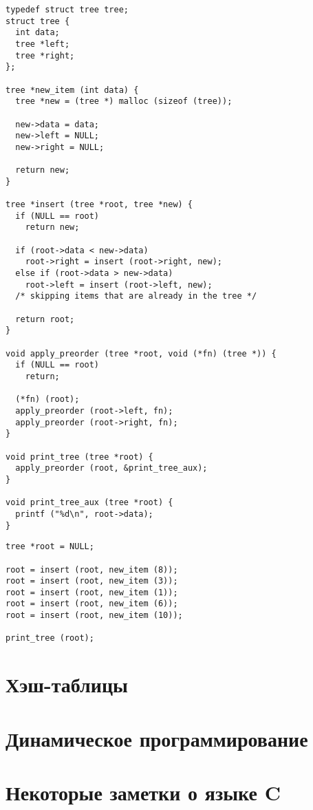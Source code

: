 \lstset{label=lst:bst-impl,caption=Некоторые операции}
\begin{lstlisting}
typedef struct tree tree;
struct tree {
  int data;
  tree *left;
  tree *right;
};

tree *new_item (int data) {
  tree *new = (tree *) malloc (sizeof (tree));

  new->data = data;
  new->left = NULL;
  new->right = NULL;

  return new;
}

tree *insert (tree *root, tree *new) {
  if (NULL == root)
    return new;

  if (root->data < new->data)
    root->right = insert (root->right, new);
  else if (root->data > new->data)
    root->left = insert (root->left, new);
  /* skipping items that are already in the tree */

  return root;
}

void apply_preorder (tree *root, void (*fn) (tree *)) {
  if (NULL == root)
    return;

  (*fn) (root);
  apply_preorder (root->left, fn);
  apply_preorder (root->right, fn);
}

void print_tree (tree *root) {
  apply_preorder (root, &print_tree_aux);
}

void print_tree_aux (tree *root) {
  printf ("%d\n", root->data);
}
\end{lstlisting}

\lstset{label=lst:bst-usage,caption=Пример использования}
\begin{lstlisting}
tree *root = NULL;

root = insert (root, new_item (8));
root = insert (root, new_item (3));
root = insert (root, new_item (1));
root = insert (root, new_item (6));
root = insert (root, new_item (10));

print_tree (root);
\end{lstlisting}

\section{Хэш-таблицы}
\label{sec:hash-tables}

\section{Динамическое программирование}
\label{sec:dyn-programming}

\section{Некоторые заметки о языке C}
\label{sec:c-notes}
